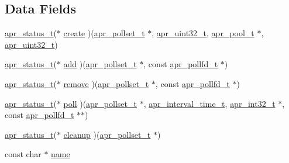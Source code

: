 \subsection*{Data Fields}
\begin{DoxyCompactItemize}
\item 
\hyperlink{group__apr__errno_gaa5105fa83cc322f09382292db8b47593}{apr\+\_\+status\+\_\+t}($\ast$ \hyperlink{structapr__pollset__provider__t_afa43fa6c93bf2a650b1320811e7d0f46}{create} )(\hyperlink{structapr__pollset__t}{apr\+\_\+pollset\+\_\+t} $\ast$, \hyperlink{group__apr__platform_ga558548a135d8a816c4787250744ea147}{apr\+\_\+uint32\+\_\+t}, \hyperlink{structapr__pool__t}{apr\+\_\+pool\+\_\+t} $\ast$, \hyperlink{group__apr__platform_ga558548a135d8a816c4787250744ea147}{apr\+\_\+uint32\+\_\+t})
\item 
\hyperlink{group__apr__errno_gaa5105fa83cc322f09382292db8b47593}{apr\+\_\+status\+\_\+t}($\ast$ \hyperlink{structapr__pollset__provider__t_a177f6f0a4134e478a7ba59f6c113cae6}{add} )(\hyperlink{structapr__pollset__t}{apr\+\_\+pollset\+\_\+t} $\ast$, const \hyperlink{structapr__pollfd__t}{apr\+\_\+pollfd\+\_\+t} $\ast$)
\item 
\hyperlink{group__apr__errno_gaa5105fa83cc322f09382292db8b47593}{apr\+\_\+status\+\_\+t}($\ast$ \hyperlink{structapr__pollset__provider__t_abe81d05aa0123864fff065052ab57ac6}{remove} )(\hyperlink{structapr__pollset__t}{apr\+\_\+pollset\+\_\+t} $\ast$, const \hyperlink{structapr__pollfd__t}{apr\+\_\+pollfd\+\_\+t} $\ast$)
\item 
\hyperlink{group__apr__errno_gaa5105fa83cc322f09382292db8b47593}{apr\+\_\+status\+\_\+t}($\ast$ \hyperlink{structapr__pollset__provider__t_a3b27b07f7ec4170af1e8d2206c759fd9}{poll} )(\hyperlink{structapr__pollset__t}{apr\+\_\+pollset\+\_\+t} $\ast$, \hyperlink{group__apr__time_gaae2129185a395cc393f76fabf4f43e47}{apr\+\_\+interval\+\_\+time\+\_\+t}, \hyperlink{group__apr__platform_ga21ef1e35fd3ff9be386f3cb20164ff02}{apr\+\_\+int32\+\_\+t} $\ast$, const \hyperlink{structapr__pollfd__t}{apr\+\_\+pollfd\+\_\+t} $\ast$$\ast$)
\item 
\hyperlink{group__apr__errno_gaa5105fa83cc322f09382292db8b47593}{apr\+\_\+status\+\_\+t}($\ast$ \hyperlink{structapr__pollset__provider__t_a949b8bdbc4e2205a03238b03aade4f64}{cleanup} )(\hyperlink{structapr__pollset__t}{apr\+\_\+pollset\+\_\+t} $\ast$)
\item 
const char $\ast$ \hyperlink{structapr__pollset__provider__t_a6413a1fb95329ef6250f2c3350fadc87}{name}
\end{DoxyCompactItemize}


